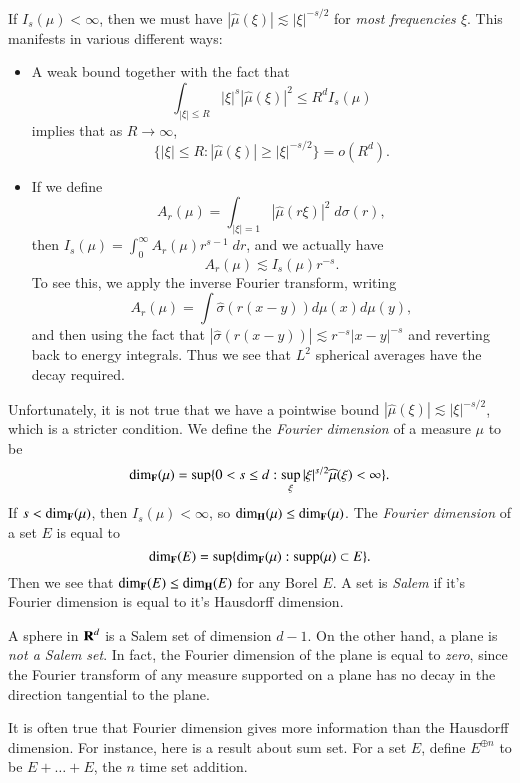 If $I_s(\mu) < \infty$, then we must have $|\widehat{\mu}(\xi)| \lesssim |\xi|^{-s/2}$ for \emph{most frequencies $\xi$}. This manifests in various different ways:
%
\begin{itemize}
  \item A weak bound together with the fact that
  \[ \int_{|\xi| \leq R} |\xi|^s |\widehat{\mu}(\xi)|^2 \leq R^d I_s(\mu) \]
  implies that as $R \to \infty$,
  \[ \{ |\xi| \leq R: |\widehat{\mu}(\xi)| \geq |\xi|^{-s/2} \} = o(R^d). \]

  \item If we define
  \[ A_r(\mu) = \int_{|\xi| = 1} |\widehat{\mu}(r \xi)|^2\; d\sigma(r), \]
  then $I_s(\mu) = \int_0^\infty A_r(\mu) r^{s-1}\; dr$, and we actually have
  \[ A_r(\mu) \lesssim I_s(\mu) r^{-s}. \]
  To see this, we apply the inverse Fourier transform, writing
  \[ A_r(\mu) = \int \widehat{\sigma}(r(x - y)) d\mu(x) d\mu(y), \]
  and then using the fact that $|\widehat{\sigma}(r(x-y))| \lesssim r^{-s} |x - y|^{-s}$ and reverting back to energy integrals. Thus we see that $L^2$ spherical averages have the decay required.
\end{itemize}
%
Unfortunately, it is not true that we have a pointwise bound $|\widehat{\mu}(\xi)| \lesssim |\xi|^{-s/2}$, which is a stricter condition. We define the \emph{Fourier dimension} of a measure $\mu$ to be
%
\[ \operatorname{\dim_{\mathbf{F}}}(\mu) = \sup \{ 0 < s \leq d: \sup_\xi |\xi|^{s/2} \widehat{\mu}(\xi) < \infty \}. \]
%
If $s < \operatorname{\dim_{\mathbf{F}}}(\mu)$, then $I_s(\mu) < \infty$, so $\operatorname{\dim_{\mathbf{H}}}(\mu) \leq \operatorname{\dim_{\mathbf{F}}}(\mu)$. The \emph{Fourier dimension} of a set $E$ is equal to
%
\[ \operatorname{\dim_{\mathbf{F}}}(E) = \sup \{ \operatorname{\dim_{\mathbf{F}}}(\mu): \text{supp}(\mu) \subset E \}. \]
%
Then we see that $\operatorname{\dim_{\mathbf{F}}}(E) \leq \operatorname{\dim_{\mathbf{H}}}(E)$ for any Borel $E$. A set is \emph{Salem} if it's Fourier dimension is equal to it's Hausdorff dimension.

\begin{example}
  A sphere in $\operatorname{\mathbf{R}}^d$ is a Salem set of dimension $d-1$. On the other hand, a plane is \emph{not a Salem set}. In fact, the Fourier dimension of the plane is equal to \emph{zero}, since the Fourier transform of any measure supported on a plane has no decay in the direction tangential to the plane.
\end{example}

It is often true that Fourier dimension gives more information than the Hausdorff dimension. For instance, here is a result about sum set. For a set $E$, define $E^{\oplus n}$ to be $E + \dots + E$, the $n$ time set addition.


